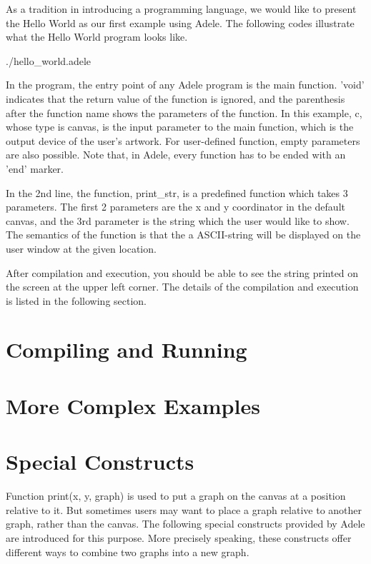 \documentclass[11pt,letterpaper]{article}
\begin{document}
As a tradition in introducing a programming language, we would like to present the Hello World as our first example using Adele. The following codes illustrate what the Hello World program looks like.

 {./hello_world.adele}

In the program, the entry point of any Adele program is the main function. 'void' indicates that the return value of the function is ignored, and the parenthesis after the function name shows the parameters of the function. In this example, c, whose type is canvas, is the input parameter to the main function, which is the output device of the user's artwork. For user-defined function, empty parameters are also possible. Note that, in Adele, every function has to be ended with an 'end' marker.

In the 2nd line, the function, print\_str, is a predefined function which takes 3 parameters. The first 2 parameters are the x and y coordinator in the default canvas, and the 3rd parameter is the string which the user would like to show. The semantics of the function is that the a ASCII-string will be displayed on the user window at the given location.

After compilation and execution, you should be able to see the string printed on the screen at the upper left corner. The details of the compilation and execution is listed in the following section.

\section {Compiling and Running}

\section {More Complex Examples}

\section {Special Constructs}

Function print(x, y, graph) is used to put a graph on the canvas at a position relative to it. But sometimes users may want to place a graph relative to another graph, rather than the canvas. The following special constructs provided by Adele are introduced for this purpose. More precisely speaking, these constructs offer different ways to combine two graphs into a new graph.
\end{document}
